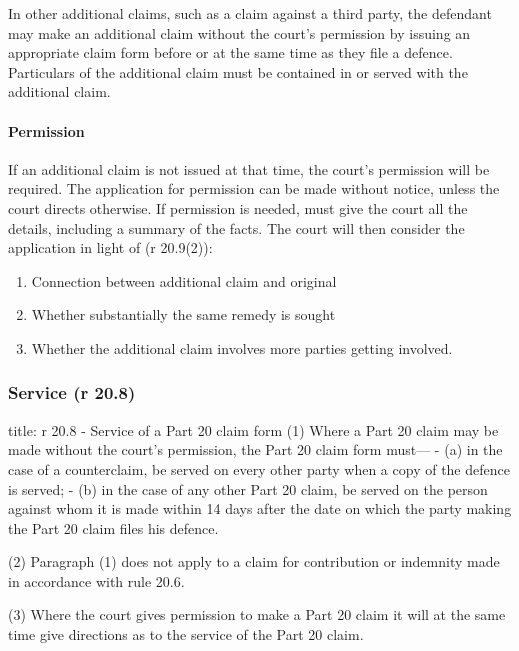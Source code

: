 \documentclass[
]{article}
\newenvironment{Shaded}{}{}
\newcommand{\NormalTok}[1]{#1}
\providecommand{\tightlist}{%
  \setlength{\itemsep}{0pt}\setlength{\parskip}{0pt}}
\begin{document}
In other additional claims, such as a claim against a third party, the
defendant may make an additional claim without the court's permission by
issuing an appropriate claim form before or at the same time as they
file a defence. Particulars of the additional claim must be contained in
or served with the additional claim.

\hypertarget{permission-1}{%
\paragraph{Permission}\label{permission-1}}

If an additional claim is not issued at that time, the court's
permission will be required. The application for permission can be made
without notice, unless the court directs otherwise. If permission is
needed, must give the court all the details, including a summary of the
facts. The court will then consider the application in light of (r
20.9(2)):

\begin{enumerate}
\def\labelenumi{\arabic{enumi}.}
\tightlist
\item
  Connection between additional claim and original
\item
  Whether substantially the same remedy is sought
\item
  Whether the additional claim involves more parties getting involved.
\end{enumerate}

\hypertarget{service-r-20.8}{%
\subsubsection{Service (r 20.8)}\label{service-r-20.8}}

\begin{Shaded}
\begin{Highlighting}[]
\NormalTok{title: r 20.8 {-} Service of a Part 20 claim form}
\NormalTok{(1) Where a Part 20 claim may be made without the court’s permission, the Part 20 claim form must—}
\NormalTok{{-} (a) in the case of a counterclaim, be served on every other party when a copy of the defence is served;}
\NormalTok{{-} (b) in the case of any other Part 20 claim, be served on the person against whom it is made within 14 days after the date on which the party making the Part 20 claim files his defence.}

\NormalTok{(2) Paragraph (1) does not apply to a claim for contribution or indemnity made in accordance with rule 20.6.}

\NormalTok{(3) Where the court gives permission to make a Part 20 claim it will at the same time give directions as to the service of the Part 20 claim. }
\end{Highlighting}
\end{Shaded}
\end{document}

